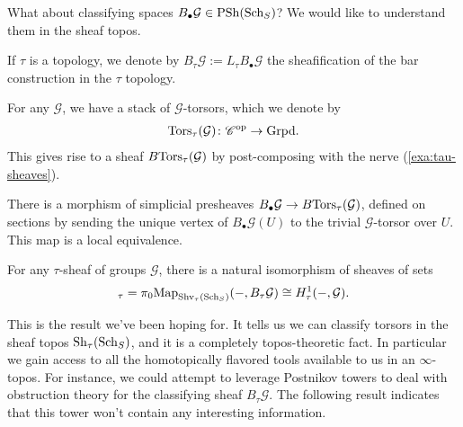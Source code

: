 \documentclass[11pt,openany]{book}
\renewcommand{\Pre}{\mathrm{PSh}}
\begin{document}
What about classifying spaces $B_{\bullet}\mathcal{G}\in \Pre(\Sch_S)$? We would like to understand them in the sheaf topos.

\begin{notation} If $\tau$ is a topology, we denote by $B_\tau \mathcal{G} := L_\tau B_\bullet \mathcal{G}$ the sheafification of the bar construction in the $\tau$ topology.
\end{notation}

\begin{example}
For any $\mathcal{G}$, we have a stack of $\mathcal{G}$-torsors, which we denote by
\begin{align*}
    \mathrm{Tors}_\tau(\mathcal{G}) \colon \mathscr{C}^{\mathrm{op}} \to \mathrm{Grpd}.
\end{align*}
This gives rise to a sheaf $B\mathrm{Tors}_\tau(\mathcal{G})$ by post-composing with the nerve (\autoref{exa:tau-sheaves}).
\end{example}




\begin{theorem}\label{thm:BG-BTorsG} 
\cite[2.3.2]{AHW2}
There is a morphism of simplicial presheaves $B_\bullet \mathcal{G} \to B\mathrm{Tors}_\tau(\mathcal{G})$, defined on sections by sending the unique vertex of $B_\bullet \mathcal{G}(U)$ to the trivial $\mathcal{G}$-torsor over $U$. This map is a local equivalence.
\end{theorem}

\begin{corollary}\label{cor:BG-representability-sheaf-topos} 
For any $\tau$-sheaf of groups $\mathcal{G}$, there is a natural isomorphism of sheaves of sets
\begin{align*}
    [-, B_\tau \mathcal{G}]_\tau = \pi_0 \Map_{\Shv_\tau(\Sch_S)}(-,B_\tau \mathcal{G}) \cong H^1_\tau(-,\mathcal{G}).
\end{align*}
\end{corollary}

This is the result we've been hoping for. It tells us we can classify torsors in the sheaf topos $\mathrm{Sh}_\tau(\mathrm{Sch}_S)$, and it is a completely topos-theoretic fact. In particular we gain access to all the homotopically flavored tools available to us in an $\infty$-topos. For instance, we could attempt to leverage Postnikov towers to deal with obstruction theory for the classifying sheaf $B_\tau \mathcal{G}$. The following result indicates that this tower won't contain any interesting information.
\end{document}
